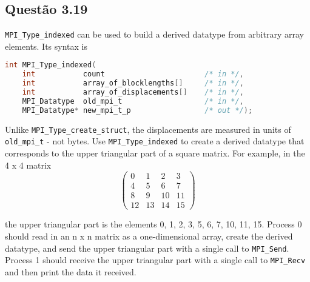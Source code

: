 

\subsection{Questão 3.19}

\texttt{MPI\_Type\_indexed} can be used to build a derived datatype from arbitrary array elements. Its syntax is

\begin{lstlisting}[language=C]
int MPI_Type_indexed(
    int           count                       /* in */,
    int           array_of_blocklengths[]     /* in */,
    int           array_of_displacements[]    /* in */,
    MPI_Datatype  old_mpi_t                   /* in */,
    MPI_Datatype* new_mpi_t_p                 /* out */);
\end{lstlisting}

Unlike \texttt{MPI\_Type\_create\_struct}, the displacements are measured in units of \texttt{old\_mpi\_t} - not bytes. Use \texttt{MPI\_Type\_indexed} to create a derived datatype that corresponds to the upper triangular part of a square matrix. For example, in the 4 x 4 matrix
\begin{equation*}
\left( \begin{array}{cccc}
0 & 1 & 2 & 3\\
4 & 5 & 6 & 7\\
8 & 9 & 10 & 11\\
12 & 13 & 14 & 15
\end{array} \right)
\end{equation*}

the upper triangular part is the elements 0, 1, 2, 3, 5, 6, 7, 10, 11, 15. Process 0 should read in an n x n matrix as a one-dimensional array, create the derived datatype, and send the upper triangular part with a single call to \texttt{MPI\_Send}. Process 1 should receive the upper triangular part with a single call to \texttt{MPI\_Recv} and then print the data it received.






